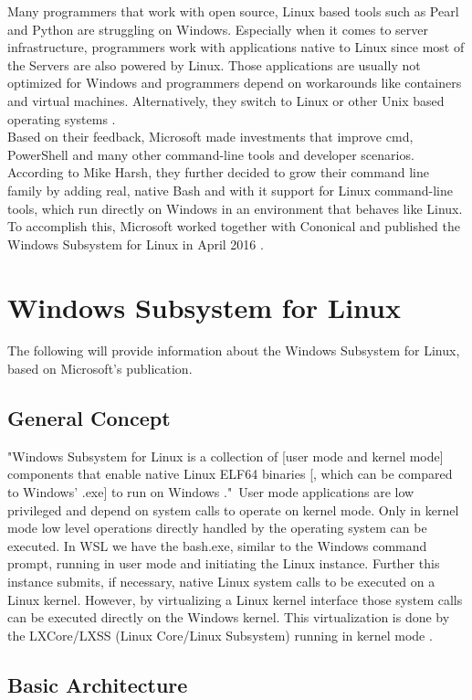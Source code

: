 \documentclass[utf8,biblatex, ngerman, english]{lni}
\begin{document}
Many programmers that work with open source, Linux based tools such as Pearl and Python are struggling on Windows. Especially when it comes to server infrastructure, programmers work with applications native to Linux since most of the Servers are also powered by Linux. Those applications are usually not optimized for Windows and programmers depend on workarounds like containers and virtual machines. Alternatively, they switch to Linux or other Unix based operating systems \cite{Ha16c}.\\
Based on their feedback, Microsoft made investments that improve cmd, PowerShell and many other command-line tools and developer scenarios. According to Mike Harsh, they further decided to grow their command line family by adding real, native Bash and with it support for Linux command-line tools, which run directly on Windows in an environment that behaves like Linux. To accomplish this, Microsoft worked together with Cononical and published the Windows Subsystem for Linux in April 2016 \cite{Ha16c}. 

\section{Windows Subsystem for Linux}
The following will provide information about the Windows Subsystem for Linux, based on Microsoft's publication.

\subsection{General Concept}
"Windows Subsystem for Linux is a collection of [user mode and kernel mode] components that enable native Linux ELF64 binaries [, which can be compared to Windows' .exe] to run on Windows \cite{Ha16b}."\ User mode applications are low privileged and depend on system calls to operate on kernel mode. Only in kernel mode low level operations directly handled by the operating system can be executed. In WSL we have the bash.exe, similar to the Windows command prompt, running in user mode and initiating the Linux instance. Further this instance submits, if necessary, native Linux system calls to be executed on a Linux kernel. However, by virtualizing a Linux kernel interface those system calls can be executed directly on the Windows kernel. This virtualization is done by the LXCore/LXSS (Linux Core/Linux Subsystem) running in kernel mode \cite{Ha16b}.

\subsection{Basic Architecture}
\end{document}

